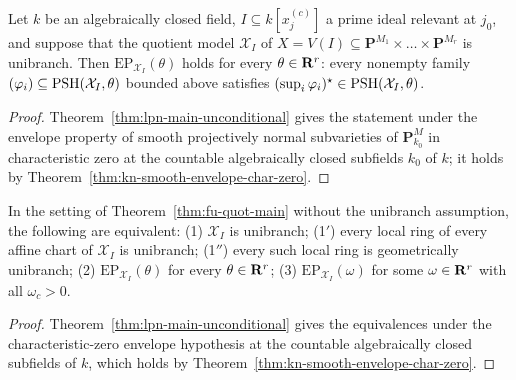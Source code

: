 \begin{theorem}
\label{thm:fu-quot-main}
\leanok
Let $k$ be an algebraically closed field, $I\subseteq k[x^{(c)}_j]$ a prime
ideal relevant at $j_0$, and suppose that the quotient model $\mathcal X_I$ of
$X=V(I)\subseteq\mathbf P^{M_1}\times\dots\times\mathbf P^{M_r}$ is unibranch.
Then $\mathrm{EP}_{\mathcal X_I}(\theta)$ holds for every $\theta\in\mathbf{R}^r$:
every nonempty family $(\varphi_i)\subseteq\operatorname{PSH}(\mathcal X_I,\theta)$ bounded
above satisfies $(\sup_i\varphi_i)^\star\in\operatorname{PSH}(\mathcal X_I,\theta)$.
\end{theorem}
\begin{proof}
Theorem~\ref{thm:lpn-main-unconditional} gives the statement under the
envelope property of smooth projectively normal subvarieties of
$\mathbf P^M_{k_0}$ in characteristic zero at the countable algebraically closed
subfields $k_0$ of $k$; it holds by Theorem~\ref{thm:kn-smooth-envelope-char-zero}.
\end{proof}

\begin{corollary}
\label{cor:fu-quot-characterization}
\leanok
In the setting of Theorem~\ref{thm:fu-quot-main} without the unibranch
assumption, the following are equivalent: (1) $\mathcal X_I$ is unibranch;
(1$'$) every local ring of every affine chart of $\mathcal X_I$ is unibranch;
(1$''$) every such local ring is geometrically unibranch; (2)
$\mathrm{EP}_{\mathcal X_I}(\theta)$ for every $\theta\in\mathbf{R}^r$; (3)
$\mathrm{EP}_{\mathcal X_I}(\omega)$ for some $\omega\in\mathbf{R}^r$ with all
$\omega_c>0$.
\end{corollary}
\begin{proof}
Theorem~\ref{thm:lpn-main-unconditional} gives the equivalences under the
characteristic-zero envelope hypothesis at the countable algebraically closed
subfields of $k$, which holds by Theorem~\ref{thm:kn-smooth-envelope-char-zero}.
\end{proof}

